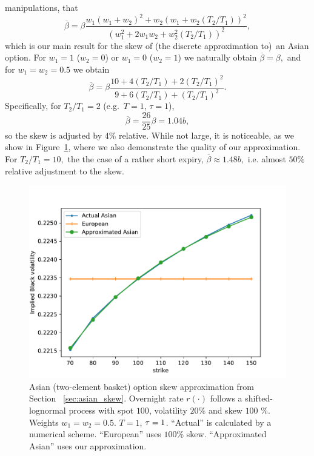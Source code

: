 \documentclass{article}
\begin{document}
manipulations, that%
\begin{equation}
\overline{\beta }=\beta \frac{w_{1}\left( w_{1}+w_{2}\right)
^{2}+w_{2}\left( w_{1}+w_{2}\left( T_{2}/T_{1}\right) \right) ^{2}}{\left(
w_{1}^{2}+2w_{1}w_{2}+w_{2}^{2}\left( T_{2}/T_{1}\right) \right) ^{2}},
\label{eq:sa2}
\end{equation}%
which is our main result for the skew of (the discrete approximation to)\ an
Asian option. For $w_{1}=1$ ($w_{2}=0$) or $w_{1}=0$ ($w_{2}=1$) we
naturally obtain $\overline{\beta }=\beta ,$ and for $w_{1}=w_{2}=0.5$ we
obtain%
\begin{equation*}
\overline{\beta }=\beta \frac{10+4\left( T_{2}/T_{1}\right) +2\left(
T_{2}/T_{1}\right) ^{2}}{9+6\left( T_{2}/T_{1}\right) +\left(
T_{2}/T_{1}\right) ^{2}}.
\end{equation*}%
Specifically, for $T_{2}/T_{1}=2$ (e.g.~$T=1$, $\tau =1$),%
\begin{equation*}
\overline{\beta }=\frac{26}{25}\beta =1.04b,
\end{equation*}%
so the skew is adjusted by $4\%$ relative. While not large, it is
noticeable, as we show in Figure~\ref{fig:asian_skew_1}, where we also
demonstrate the quality of our approximation. For $T_{2}/T_{1}=10,$ the the
case of a rather short expiry, $\overline{\beta }\approx 1.48b,$ i.e. almost 
$50\%$ relative adjustment to the skew.

\begin{figure}[ht]
\includegraphics[origin=c,width=0.8%
\textwidth]{fig_skew_appr_vs_actual_01.pdf}
\caption{Asian (two-element basket) option skew approximation from Section~%
\protect\ref{sec:asian_skew}. Overnight rate $r(\cdot)$ follows a
shifted-lognormal process with spot $100$, volatility $20$\% and skew $100$%
\%. Weights $w_1=w_2=0.5$. $T=1$, $\protect\tau=1$. ``Actual'' is calculated
by a numerical scheme. ``European'' uses $100$\% skew. ``Approximated
Asian'' uses our approximation.}
\label{fig:asian_skew_1}
\end{figure}
\end{document}
